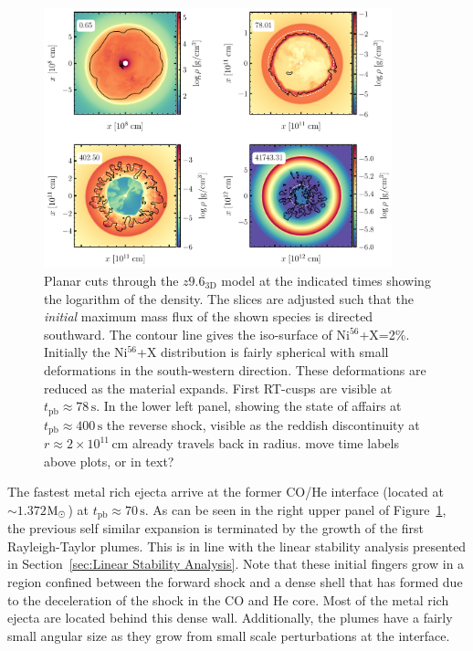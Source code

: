 \documentclass[fleqn,usenatbib]{mnras}
\newcommand{\nickel}{$\mathrm{Ni^{56}}$\xspace}
\newcommand{\tracer}{$\mathrm{X}$\xspace}
\newcommand{\solm}{\xspace\ensuremath{\rm{M_{\odot}}}\xspace}
\newcommand{\COM}[1]{{\color{orange}#1}}
\begin{document}
\fi
\begin{figure}
 \centering
 \includegraphics[width=0.9\textwidth]{pic/rho_cuts_z9_3d_4times.pdf}
 \caption{Planar cuts through the $z9.6_{\mathrm{3D}}$ model at the indicated times showing the logarithm of the density. The slices are adjusted such that the \textit{initial} maximum mass flux of the shown species is directed southward. The contour line gives the iso-surface of \nickel+\tracer=2\%. Initially the \nickel+\tracer distribution is fairly spherical with small deformations in the south-western direction. These deformations are reduced as the material expands. First RT-cusps are visible at $t_{\mathrm{pb}}\approx 78\,\text{s}$. In the lower left panel, showing the state of affairs at  $t_{\mathrm{pb}}\approx 400\,\text{s}$ the reverse shock, visible as the reddish discontinuity at $r\approx 2\times 10^{11}\,\mathrm{cm}$ already travels back in radius. \COM{move time labels above plots, or in text?}}
 \label{fig:z9 3d 4times}
\end{figure}

The fastest metal rich ejecta arrive at the former CO/He interface (located at $\sim1.372$\solm) at $t_{\mathrm{pb}}\approx 70\,\text{s}$. As can be seen in the right upper panel of Figure~\ref{fig:z9 3d 4times}, the previous self similar expansion is terminated by the growth of the first Rayleigh-Taylor plumes. This is in line with the linear stability analysis presented in Section~\ref{sec:Linear Stability Analysis}. Note that these initial fingers grow in a region confined between the forward shock and a dense shell that has formed due to the deceleration of the shock in the CO and He core. Most of the metal rich ejecta are located behind this dense wall. Additionally, the plumes have a fairly small angular size as they grow from small scale perturbations at the interface. 
\end{document}
